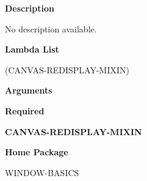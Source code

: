  
{\bf Description}

No description available.

 
{\bf Lambda List}

(CANVAS-REDISPLAY-MIXIN)

 
{\bf Arguments}


\beginhang
{\bf Required}\hspace{2em}
 
{\bf CANVAS-REDISPLAY-MIXIN}


 
\endhang
 
{\bf Home Package}

WINDOW-BASICS

